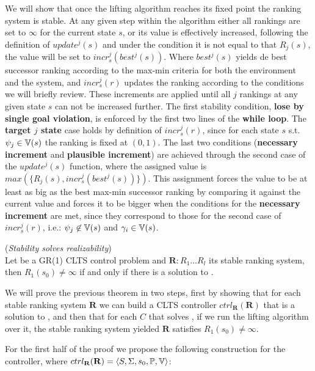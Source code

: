 We will show that once the lifting algorithm reaches its fixed point the ranking system is stable.
At any given step within the algorithm either all rankings are set to $\infty$ for the current state $s$, or its value is effectively increased, following the definition of $update^j(s)$ and under the condition it is not equal to that $R_j(s)$, the value will be set to $incr_s^j(best^j(s))$.  Where $best^j(s)$ yields de best successor ranking according to the max-min criteria for both the environment and the system, and $incr_s^j(r)$ updates the ranking according to the conditions we will briefly review. These increments are applied until all $j$ rankings at any given state $s$ can not be increased further. The first stability condition, \textbf{lose by single goal violation}, is enforced by the first two lines of the \textbf{while loop}. The \textbf{target $j$ state} case holds by definition of $incr_s^j(r)$, since for each state $s$ s.t. $\psi_j \in \mathbb{V}(s)$ the ranking is fixed at $(0,1)$. The last two conditions (\textbf{necessary increment} and \textbf{plausible increment}) are achieved through the second case of the $update^j(s)$ function, where the assigned value is $max(\{R_j(s),incr_s^j(best^j(s))\})$. This assignment forces the value to be at least as big as the best max-min successor ranking by comparing it against the current value and forces it to be bigger when the conditions for the \textbf{necessary increment} are met, since they correspond to those for the second case of $incr_s^j(r)$, i.e.: $\psi_j \not\in \mathbb{V}(s)$ and $\gamma_i \in \mathbb{V}(s)$. 

\begin{theorem}(\emph{Stability solves realizability})\label{theorem:gr1_stability_realizability}\\
	Let \controlProblemDef be a GR(1) CLTS control problem and $\mathbf{R}:R_1 \ldots R_l$ its stable ranking system, then $R_1(s_0) \neq \infty$ if and only if there is a solution to \controlProblem.
	\normalsize
\end{theorem}

We will prove the previous theorem in two steps, first by showing that for each stable ranking system $\mathbf{R}$ we can build a CLTS controller $ctrl_{\mathbf{R}}(\mathbf{R})$ that is a solution to \controlProblem, and then that for each $C$ that solves \controlProblem, if we run the lifting algorithm over it, the stable ranking system yielded $\mathbf{R}$ satisfies $R_1(s_0) \neq \infty$.

For the first half of the proof we propose the following construction for the controller, where $ctrl_{\mathbf{R}}(\mathbf{R})= \langle S, \Sigma, s_0, \mathbb{P}, \mathbb{V} \rangle$:

